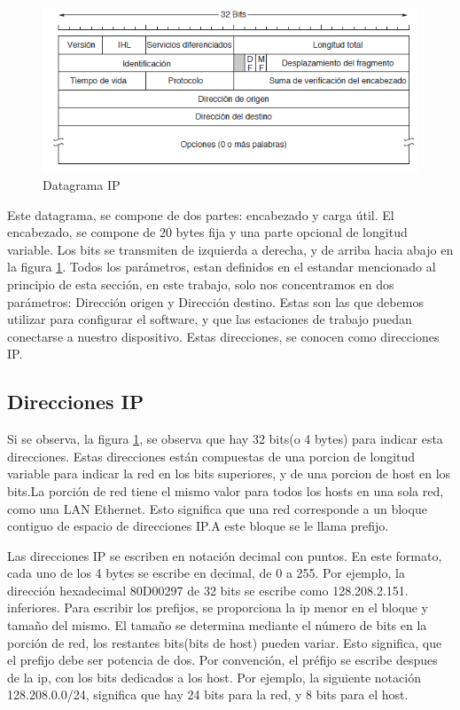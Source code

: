 \begin{figure}[ht]
	\centering
	\includegraphics{parte_2/redes/datagip}
	\caption{Datagrama IP}
	\label{fig:datIP}
\end{figure} 
Este datagrama, se compone de dos partes: encabezado y carga útil. El encabezado, se compone de 20 bytes fija y una parte opcional de longitud variable. Los bits se transmiten de izquierda a derecha, y de arriba hacia abajo en la figura \ref{fig:datIP}. Todos los parámetros, estan definidos en el estandar mencionado al principio de esta sección, en este trabajo, solo nos concentramos en dos parámetros: Dirección origen y Dirección destino. Estas son las que debemos utilizar para configurar el software, y que las estaciones de trabajo puedan conectarse a nuestro dispositivo. Estas direcciones, se conocen como direcciones IP. 
\subsection{Direcciones IP} 
Si se observa, la figura \ref{fig:datIP}, se observa que hay 32 bits(o 4 bytes) para indicar esta direcciones. Estas direcciones están compuestas de una porcion de longitud variable para indicar la red en los bits superiores, y de una porcion de host en los bits.La porción de red tiene el mismo valor para todos los hosts en una sola red, como una LAN Ethernet. Esto significa que una red corresponde a un bloque contiguo de espacio de direcciones IP.A este bloque se le llama prefijo. 

Las direcciones IP se escriben en notación decimal con puntos. En este formato, cada uno de los 4 bytes se escribe en decimal, de 0 a 255. Por ejemplo, la dirección hexadecimal 80D00297 de 32 bits se escribe como 128.208.2.151.  
inferiores. Para escribir los prefijos, se proporciona la ip menor en el bloque y tamaño del mismo. El tamaño se determina mediante el número de bits en la porción de red, los restantes bits(bits de host) pueden variar. Esto significa, que el prefijo debe ser potencia de dos. Por convención, el préfijo se escribe despues de la ip, con los bits dedicados a los host. Por ejemplo, la siguiente notación 128.208.0.0/24, significa que hay 24 bits para la red, y 8 bits para el host. 

